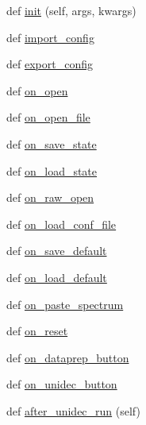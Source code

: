 \begin{DoxyCompactItemize}
\item 
def \hyperlink{class_uni_dec_1_1_g_uni_dec_1_1_uni_dec_app_aacb45ae084252b7d1c780f5fd247aeae}{init} (self, args, kwargs)
\item 
def \hyperlink{class_uni_dec_1_1_g_uni_dec_1_1_uni_dec_app_a688e3ab174d22be8e7d7d52192421615}{import\+\_\+config}
\item 
def \hyperlink{class_uni_dec_1_1_g_uni_dec_1_1_uni_dec_app_a0cb3bacc29fcc5279c546f38f5cfc556}{export\+\_\+config}
\item 
def \hyperlink{class_uni_dec_1_1_g_uni_dec_1_1_uni_dec_app_a50e2e6eea1c7932107cc9cd1e54c49f8}{on\+\_\+open}
\item 
def \hyperlink{class_uni_dec_1_1_g_uni_dec_1_1_uni_dec_app_ae7d778188c2353e8da64e7a9078dc136}{on\+\_\+open\+\_\+file}
\item 
def \hyperlink{class_uni_dec_1_1_g_uni_dec_1_1_uni_dec_app_a7507673ba78eacc0d52df5094d00ae8c}{on\+\_\+save\+\_\+state}
\item 
def \hyperlink{class_uni_dec_1_1_g_uni_dec_1_1_uni_dec_app_ab9b63fda6708bd74b56019d7993693eb}{on\+\_\+load\+\_\+state}
\item 
def \hyperlink{class_uni_dec_1_1_g_uni_dec_1_1_uni_dec_app_aecd7f5ba68d6d7df19e7c3651d5d6798}{on\+\_\+raw\+\_\+open}
\item 
def \hyperlink{class_uni_dec_1_1_g_uni_dec_1_1_uni_dec_app_add573bb463b1ae098c86d9b686dd7e45}{on\+\_\+load\+\_\+conf\+\_\+file}
\item 
def \hyperlink{class_uni_dec_1_1_g_uni_dec_1_1_uni_dec_app_afe212ffddb31a0d3e410a415b8c9b19b}{on\+\_\+save\+\_\+default}
\item 
def \hyperlink{class_uni_dec_1_1_g_uni_dec_1_1_uni_dec_app_a63e4c1c1ccd5f3b087249fee214ecd6a}{on\+\_\+load\+\_\+default}
\item 
def \hyperlink{class_uni_dec_1_1_g_uni_dec_1_1_uni_dec_app_a4edf6b2579e9952a0f56609d5641de9e}{on\+\_\+paste\+\_\+spectrum}
\item 
def \hyperlink{class_uni_dec_1_1_g_uni_dec_1_1_uni_dec_app_acccb24906699f6214792cb4a1cb2c4dd}{on\+\_\+reset}
\item 
def \hyperlink{class_uni_dec_1_1_g_uni_dec_1_1_uni_dec_app_a9aa6dbdda9184e17a1516f92baf4e753}{on\+\_\+dataprep\+\_\+button}
\item 
def \hyperlink{class_uni_dec_1_1_g_uni_dec_1_1_uni_dec_app_ab201aef8fed8d975d1687e5b06f5e777}{on\+\_\+unidec\+\_\+button}
\item 
def \hyperlink{class_uni_dec_1_1_g_uni_dec_1_1_uni_dec_app_a20c3bd8746429ab511bbeec11fc8fafe}{after\+\_\+unidec\+\_\+run} (self)

\end{DoxyCompactItemize}

